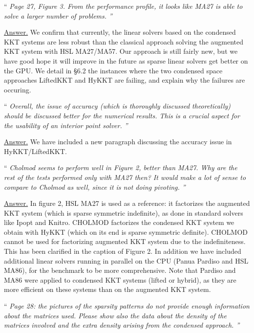 \documentclass[10pt,a4paper]{article}
\newenvironment{quotereviewer}{\vspace{.5cm}{\underline\reviewername} ``\it\footnotesize}{''}
\newcommand{\answer}{\vspace{1mm}\underline{Answer.} }
\begin{document}
\begin{quotereviewer}
Page 27, Figure 3. From the performance profile, it looks like MA27 is able to solve a larger number of problems.
\end{quotereviewer}

\answer We confirm that currently, the linear solvers based on the condensed KKT systems are less robust than
the classical approach solving the augmented KKT system with HSL MA27/MA57.
Our approach is still fairly new, but we have good hope it will improve in the future
as sparse linear solvers get better on the GPU.
We detail in \S 6.2 the instances where the two condensed space approaches LiftedKKT
and HyKKT are failing, and explain why the failures are occuring.


\begin{quotereviewer}
Overall, the issue of accuracy (which is thoroughly discussed theoretically) should be discussed better for the numerical results. This is a crucial aspect for the usability of an interior point solver.
\end{quotereviewer}

\answer We have included a new paragraph discussing the accuracy issue in HyKKT/LiftedKKT.

\begin{quotereviewer}
Cholmod seems to perform well in Figure 2, better than MA27. Why are the rest of the tests performed only with MA27 then? It would make a lot of sense to compare to Cholmod as well, since it is not doing pivoting.
\end{quotereviewer}

\answer In figure 2, HSL MA27 is used as a reference: it factorizes
the augmented KKT system (which is sparse symmetric indefinite), as done in standard solvers like Ipopt and Knitro.
CHOLMOD factorizes the condensed KKT system we obtain with HyKKT (which on its end is sparse symmetric definite).
CHOLMOD cannot be used for factorizing augmented KKT system due to the indefiniteness.
This has been clarified in the caption of Figure 2.
In addition we have included additional linear solvers running in parallel
on the CPU (Panua Pardiso and HSL MA86), for the benchmark to be more comprehensive.
Note that Pardiso and MA86 were applied to condensed KKT systems (lifted or hybrid), as they are more efficient on these systems than on the augmented KKT system.

\begin{quotereviewer}
Page 28: the pictures of the sparsity patterns do not provide enough information about the matrices used. Please show also the data about the density of the matrices involved and the extra density arising from the condensed approach.
\end{quotereviewer}
\end{document}
